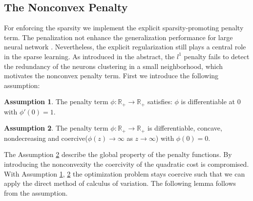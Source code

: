 \documentclass[12pt,fleqn]{amsart}
\theoremstyle{definition}
\newtheorem{assumption}{Assumption}[section]
\begin{document}
\subsection{The Nonconvex Penalty}
For enforcing the sparsity we implement the explicit sparsity-promoting penalty term. 
The penalization not enhance the generalization performance for large neural network \cite{zhang2021understanding}. 
Nevertheless, the explicit regularization still plays a central role in the sparse learning. 
As introduced in the abstract, the $l^1$ penalty fails to detect the redundancy of the neurons clustering in a small neighborhood, which motivates the nonconvex penalty term. First we introduce the following assumption:
\begin{assumption} \label{pen1}
	The penalty term $\phi: \mathbb{R}_+ \rightarrow \mathbb{R}_+$ satisfies: $\phi$ is differentiable at 0 with $\phi'(0) = 1$. 
\end{assumption}

\begin{assumption} \label{pen2}
The penalty term $\phi: \mathbb{R}_+ \rightarrow \mathbb{R}_+$ is differentiable, concave, nondecreasing and coercive($\phi(z) \rightarrow \infty$ as $z \rightarrow \infty$) with $\phi(0) = 0$.
\end{assumption}
 
The Assumption \ref{pen2} describe the global property of the penalty functions. 
By introducing the nonconvexity the coercivity of the quadratic cost is compromised. 
With Assumption \ref{pen1}, \ref{pen2} the optimization problem stays coercive such that we can apply the direct method of calculus of variation. 
The following lemma follows from the assumption. 
 
\end{document}
